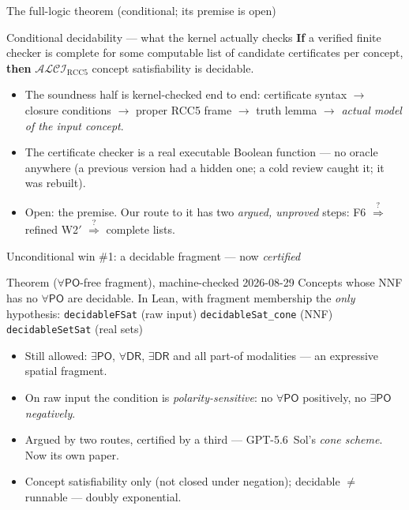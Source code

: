 \documentclass[aspectratio=169,11pt]{beamer}
\newcommand{\ALCIRCC}[1]{\mathcal{ALCI}_{\mathrm{RCC#1}}}
\newcommand{\DR}{\mathsf{DR}}
\newcommand{\PO}{\mathsf{PO}}
\begin{document}
\begin{frame}{The full-logic theorem (conditional; its premise is open)}
\begin{block}{Conditional decidability --- what the kernel actually checks}
  \textbf{If} a verified finite checker is complete for some computable list
  of candidate certificates per concept, \textbf{then} $\ALCIRCC{5}$ concept
  satisfiability is \alert{decidable}.
\end{block}
\vfill
\begin{itemize}
  \item The \alert{soundness half} is kernel-checked end to end:
        certificate syntax $\to$ closure conditions $\to$ proper RCC5 frame
        $\to$ truth lemma $\to$ \emph{actual model of the input concept}.
  \item The certificate checker is a real \alert{executable Boolean function}
        --- no oracle anywhere (a previous version had a hidden one;
        a cold review caught it; it was rebuilt).
  \item Open: the \alert{premise}. Our route to it has two \emph{argued, unproved}
        steps: F6 $\overset{?}{\Rightarrow}$ refined W2$'$
        $\overset{?}{\Rightarrow}$ complete lists.
\end{itemize}
\end{frame}

\begin{frame}{Unconditional win \#1: a decidable fragment --- now \emph{certified}}
\begin{block}{Theorem ($\forall\PO$-free fragment), machine-checked 2026-08-29}
  Concepts whose NNF has \alert{no $\forall\PO$} are \alert{decidable}.
  In Lean, with fragment membership the \emph{only} hypothesis:
  \smallskip
  {\scriptsize\texttt{decidableFSat} (raw input) \quad
   \texttt{decidableSat\_cone} (NNF) \quad
   \texttt{decidableSetSat} (real sets)}
\end{block}
\vfill
\begin{itemize}
  \item Still allowed: $\exists\PO$, $\forall\DR$, $\exists\DR$ and
        \alert{all} part-of modalities --- an expressive spatial fragment.
  \item On \alert{raw} input the condition is \emph{polarity-sensitive}: no
        $\forall\PO$ positively, no $\exists\PO$ \emph{negatively}.
  \item Argued by two routes, \alert{certified} by a third ---
        GPT-5.6~Sol's \emph{cone scheme}. Now its own paper.
  \item Concept satisfiability only (not closed under negation);
        \alert{decidable $\neq$ runnable} --- doubly exponential.
\end{itemize}
\end{frame}
\end{document}
